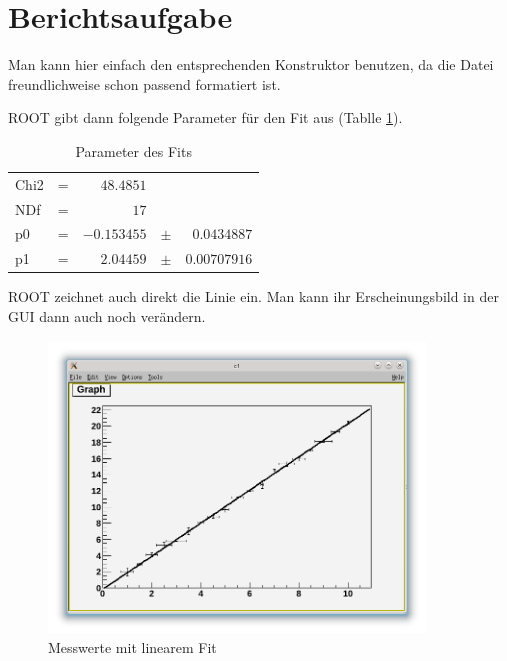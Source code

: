 \section{Berichtsaufgabe}

Man kann hier einfach den entsprechenden Konstruktor benutzen, da die Datei freundlichweise schon passend formatiert ist.


ROOT gibt dann folgende Parameter für den Fit aus (Tablle \ref{table:fit}).

\begin{table}[h]
\begin{center}
\begin{tabular}{lcrcr}
Chi2 & = & $48.4851$ &  \\ 
NDf & = & $17$ &  \\ 
p0 & = & $-0.153455$ & $\pm$ & $0.0434887$ \\ 
p1 & = & $2.04459$ & $\pm$ & $0.00707916$ \\ 
\end{tabular} 
\caption{Parameter des Fits}
\label{table:fit}
\end{center}
\end{table}

ROOT zeichnet auch direkt die Linie ein. Man kann ihr Erscheinungsbild in der GUI dann auch noch verändern.


\begin{figure}[h]
\begin{center}
\includegraphics[width=10cm]{Uebung_10/fit.png}
\caption{Messwerte mit linearem Fit}
\end{center}
\end{figure}
